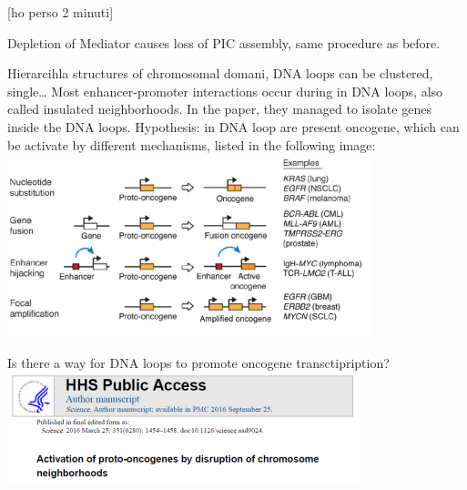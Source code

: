 {[}ho perso 2 minuti{]}

Depletion of Mediator causes loss of PIC assembly, same procedure as before.

Hierarcihla structures of chromosomal domani, DNA loops can be clustered, single\ldots{}
Most enhancer-promoter interactions occur during in DNA loops, also called insulated neighborhoods. In the paper, they managed to isolate genes inside the DNA loops.
Hypothesis: in DNA loop are present oncogene, which can be activate by different mechanisms, listed in the following image:
\includegraphics{../_resources/4eb79fba5a169cc3d31f5400dee44c80.png}

Is there a way for DNA loops to promote oncogene transctipription?
\includegraphics{../_resources/8a611db05ed930551f476248a8829f49.png}

